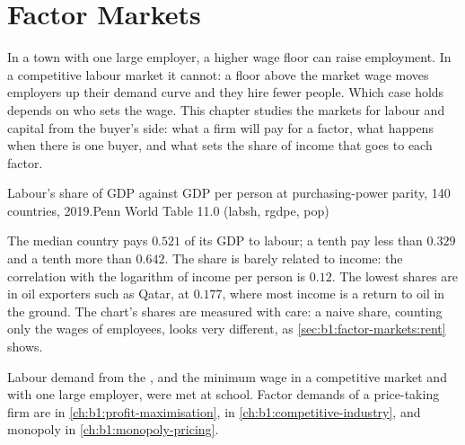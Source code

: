 \chapter{Factor Markets}\label{ch:b1:factor-markets}

In a town with one large employer, a higher wage floor can raise
employment. In a competitive labour market it cannot: a floor above the
market wage moves employers up their demand curve and they hire fewer
people. Which case holds depends on who sets the wage. This chapter
studies the markets for labour and capital from the buyer's side: what a
firm will pay for a factor, what happens when there is one buyer, and what
sets the share of income that goes to each factor.

\begin{openingchart}{Labour's share of GDP against GDP per person at
purchasing-power parity, 140 countries, 2019.}{Penn World Table 11.0
(labsh, rgdpe, pop)}
\end{openingchart}

The median country pays $0.521$ of its GDP to labour; a tenth pay less than
$0.329$ and a tenth more than $0.642$. %
The share is barely related to income: the correlation with the logarithm
of income per person is $0.12$. %
The lowest shares are in oil exporters such as Qatar, at $0.177$, where most
income is a return to oil in the ground. %
The chart's shares are measured with care: a naive share, counting only
the wages of employees, looks very different, as
\cref{sec:b1:factor-markets:rent} shows.

\begin{recall}
Labour demand from the , and the minimum wage
in a competitive market and with one large employer, were met at school.
Factor demands of a price-taking firm are in \cref{ch:b1:profit-maximisation},
 in \cref{ch:b1:competitive-industry}, and monopoly in
\cref{ch:b1:monopoly-pricing}.
\end{recall}

